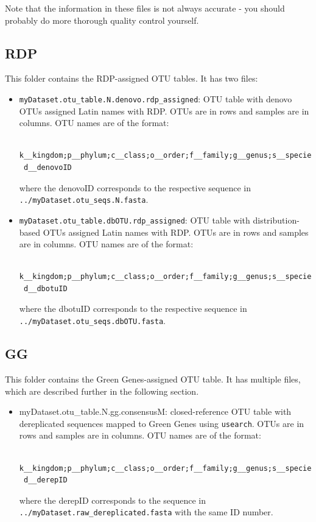 \documentclass[11pt, oneside]{article}   	%
\begin{document}
Note that the information in these files is not always accurate - you
should probably do more thorough quality control yourself.

\subsection{RDP}
This folder contains the RDP-assigned OTU tables. It has two files:
\begin{itemize}
	\item {\tt myDataset.otu\_table.N.denovo.rdp\_assigned}: OTU table with denovo OTUs assigned Latin names with RDP. OTUs are in rows and samples are in columns. OTU names are of the format: \begin{verbatim}
 k__kingdom;p__phylum;c__class;o__order;f__family;g__genus;s__species;
 d__denovoID
\end{verbatim} where the denovoID corresponds to the respective sequence in {\tt ../myDataset.otu\_seqs.N.fasta}.
	\item {\tt myDataset.otu\_table.dbOTU.rdp\_assigned}: OTU table with distribution-based OTUs assigned Latin names with RDP. OTUs are in rows and samples are in columns. OTU names are of the format: \begin{verbatim}
 k__kingdom;p__phylum;c__class;o__order;f__family;g__genus;s__species;
 d__dbotuID
\end{verbatim} where the dbotuID corresponds to the respective sequence in {\tt ../myDataset.otu\_seqs.dbOTU.fasta}.
\end{itemize}

\subsection{GG}
This folder contains the Green Genes-assigned OTU table. It has multiple files, which are described further in the following section.
\begin{itemize}
	\item {myDataset.otu\_table.N.gg.consensusM}: closed-reference OTU table with dereplicated sequences mapped to Green Genes using {\tt usearch}. OTUs are in rows and samples are in columns. OTU names are of the format:
\begin{verbatim}
 k__kingdom;p__phylum;c__class;o__order;f__family;g__genus;s__species;
 d__derepID
\end{verbatim} where the derepID corresponds to the sequence in {\tt ../myDataset.raw\_dereplicated.fasta} with the same ID number.
\end{itemize}
\end{document}
